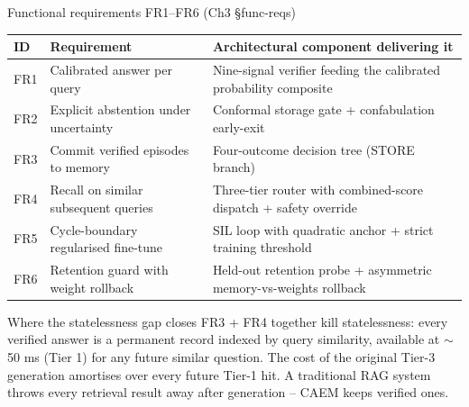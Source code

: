 \documentclass[10pt,aspectratio=169]{beamer}
\begin{document}
\begin{frame}{Functional requirements FR1--FR6 (Ch3 \S func-reqs)}
  \scriptsize
  \begin{tabular}{@{}p{0.6cm}p{4cm}p{8cm}@{}}
    \toprule
    \textbf{ID} & \textbf{Requirement} & \textbf{Architectural component delivering it} \\
    \midrule
    FR1 & Calibrated answer per query & Nine-signal verifier feeding the calibrated probability composite \\
    FR2 & Explicit abstention under uncertainty & Conformal storage gate + confabulation early-exit \\
    FR3 & Commit verified episodes to memory & Four-outcome decision tree (STORE branch) \\
    FR4 & Recall on similar subsequent queries & Three-tier router with combined-score dispatch + safety override \\
    FR5 & Cycle-boundary regularised fine-tune & SIL loop with quadratic anchor + strict training threshold \\
    FR6 & Retention guard with weight rollback & Held-out retention probe + asymmetric memory-vs-weights rollback \\
    \bottomrule
  \end{tabular}

  \vspace{0.6em}
  \begin{block}{Where the statelessness gap closes}
    FR3 + FR4 together kill statelessness: every verified answer is a permanent record indexed by query similarity, available at $\sim$50 ms (Tier 1) for any future similar question. The cost of the original Tier-3 generation amortises over every future Tier-1 hit. A traditional RAG system throws every retrieval result away after generation -- CAEM keeps verified ones.
  \end{block}
\end{frame}
\end{document}
